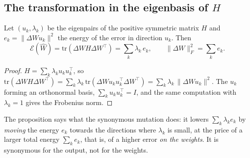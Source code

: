 \subsection{The transformation in the eigenbasis of \texorpdfstring{$H$}{H}}\label{t3sno:sec:spectre}

\begin{proposition}\label{t3sno:prop:propre}
Let $(u_k, \lambda_k)$ be the eigenpairs of the positive symmetric matrix $H$ and $e_k = \lVert \Delta W u_k \rVert^2$ the energy of the error in direction $u_k$. Then
\[
\mathcal{E}(\hat W) = \mathrm{tr}(\Delta W H \Delta W^\top) = \sum_k \lambda_k\, e_k,
\qquad
\lVert \Delta W \rVert_F^2 = \sum_k e_k .
\]
\end{proposition}
\begin{proof}
$H = \sum_k \lambda_k u_k u_k^\top$, so $\mathrm{tr}(\Delta W H \Delta W^\top) = \sum_k \lambda_k\, \mathrm{tr}(\Delta W u_k u_k^\top \Delta W^\top) = \sum_k \lambda_k\, \lVert \Delta W u_k\rVert^2$. The $u_k$ forming an orthonormal basis, $\sum_k u_k u_k^\top = I$, and the same computation with $\lambda_k = 1$ gives the Frobenius norm.
\end{proof}

\begin{lecture}
The proposition says what the synonymous mutation does: it lowers $\sum_k \lambda_k e_k$ by \emph{moving} the energy $e_k$ towards the directions where $\lambda_k$ is small, at the price of a larger total energy $\sum_k e_k$, that is, of a higher error \emph{on the weights}. It is synonymous for the output, not for the weights.
\end{lecture}

